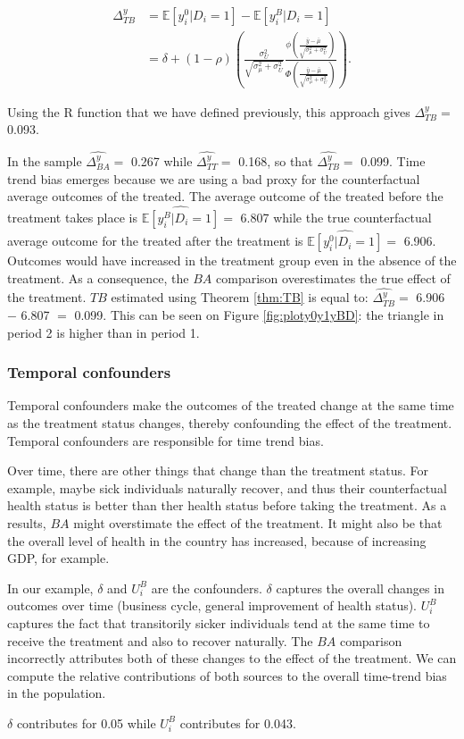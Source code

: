 \documentclass[]{book}
\newcommand{\esp}[1]{\mathbb{E}[ #1 ]}
\theoremstyle{definition}
\theoremstyle{definition}
\theoremstyle{definition}
\theoremstyle{remark}
\let\BeginKnitrBlock\begin \let\EndKnitrBlock\end
\begin{document}
\begin{align*}
\Delta^y_{TB} & = \esp{y_i^0|D_i=1}-\esp{y_i^B|D_i=1} \\
              & = \delta + (1-\rho)\left(\frac{\sigma^2_{U}}{\sqrt{\sigma^2_{\mu}+\sigma^2_{U}}}\frac{\phi\left(\frac{\bar{y}-\bar{\mu}}{\sqrt{\sigma^2_{\mu}+\sigma^2_{U}}}\right)}{\Phi\left(\frac{\bar{y}-\bar{\mu}}{\sqrt{\sigma^2_{\mu}+\sigma^2_{U}}}\right)}\right).
\end{align*}

Using the R function that we have defined previously, this approach
gives \(\Delta^y_{TB}=\) 0.093.

In the sample \(\hat{\Delta^y_{BA}}=\) 0.267 while
\(\hat{\Delta^y_{TT}}=\) 0.168, so that \(\hat{\Delta^y_{TB}}=\) 0.099.
Time trend bias emerges because we are using a bad proxy for the
counterfactual average outcomes of the treated. The average outcome of
the treated before the treatment takes place is
\(\hat{\esp{y_i^B|D_i=1}}=\) 6.807 while the true counterfactual average
outcome for the treated after the treatment is
\(\hat{\esp{y_i^0|D_i=1}}=\) 6.906. Outcomes would have increased in the
treatment group even in the absence of the treatment. As a consequence,
the \(BA\) comparison overestimates the true effect of the treatment.
\(TB\) estimated using Theorem \ref{thm:TB} is equal to:
\(\hat{\Delta^y_{TB}}=\) 6.906 \(-\) 6.807 \(=\) 0.099. This can be seen
on Figure \ref{fig:ploty0y1yBD}: the triangle in period 2 is higher than
in period 1.

\subsubsection{Temporal confounders}\label{temporal-confounders}

Temporal confounders make the outcomes of the treated change at the same
time as the treatment status changes, thereby confounding the effect of
the treatment. Temporal confounders are responsible for time trend bias.

Over time, there are other things that change than the treatment status.
For example, maybe sick individuals naturally recover, and thus their
counterfactual health status is better than ther health status before
taking the treatment. As a results, \(BA\) might overstimate the effect
of the treatment. It might also be that the overall level of health in
the country has increased, because of increasing GDP, for example.

\BeginKnitrBlock{example}
\protect\hypertarget{exm:unnamed-chunk-29}{}{\label{exm:unnamed-chunk-29}
}In our example, \(\delta\) and \(U_i^B\) are the confounders.
\(\delta\) captures the overall changes in outcomes over time (business
cycle, general improvement of health status). \(U^B_i\) captures the
fact that transitorily sicker individuals tend at the same time to
receive the treatment and also to recover naturally. The \(BA\)
comparison incorrectly attributes both of these changes to the effect of
the treatment. We can compute the relative contributions of both sources
to the overall time-trend bias in the population.
\EndKnitrBlock{example} \(\delta\) contributes for 0.05 while \(U^B_i\)
contributes for 0.043.
\end{document}
